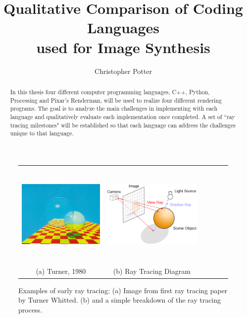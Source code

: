 \documentclass{article}
\title{Qualitative Comparison of Coding Languages\\ used for Image Synthesis}
\author{Christopher Potter}
\begin{document}
\maketitle

\begin{abstract}
 In this thesis four different computer programming languages, C++, Python, Processing and Pixar's Renderman, will be used to realize four different rendering programs.  The goal is to analyze the main challenges in implementing with each language and qualitatively evaluate each implementation once completed.  A set of ``ray tracing milestones" will be established so that each language can address the challenges unique to that language.
\end{abstract}
\begin{figure}[htbp]
\begin{center}
\begin{tabular}{cccccc}
\includegraphics[height=2.00in]{images/turner}&
\includegraphics[height=2.00in]{images/Ray_trace_diagram}\\
(a) Turner, 1980 & (b) Ray Tracing Diagram \\
\end{tabular}
\caption{Examples of early ray tracing: (a) Image from first ray tracing paper by Turner Whitted. (b) and a simple breakdown of the ray tracing process.}
\label{fig:regions}
\end{center}
\end{figure}
\end{document}
